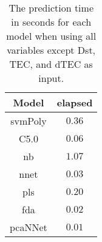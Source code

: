 \begin{table}[!ht]
	\centering
	\begin{tabular}{|c|c|}
		\hline
		Model & elapsed \\ \hline
		svmPoly & $0.36$ \\ \hline
		C5.0 & $0.06$ \\ \hline
		nb & $1.07$ \\ \hline
		nnet & $0.03$ \\ \hline
		pls & $0.20$ \\ \hline
		fda & $0.02$ \\ \hline
		pcaNNet & $0.01$ \\ \hline
	\end{tabular}
	\caption{The prediction time in seconds for each model when using all variables except Dst, TEC, and dTEC as input.}
	\label{tab:time:noTEC:predict}
\end{table}
